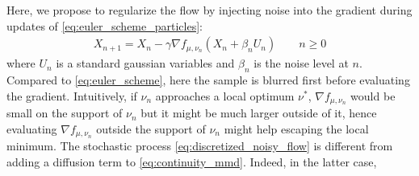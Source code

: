 Here, we propose to regularize the flow by injecting noise into the gradient during updates of \cref{eq:euler_scheme_particles}: %
\begin{align}\label{eq:discretized_noisy_flow}
	X_{n+1} = X_{n} -\gamma \nabla f_{\mu,\nu_n}(X_n+ \beta_n U_n) \qquad n\geq 0
\end{align}
where $U_n$ is a standard gaussian variables and $\beta_n$ is the noise level at $n$. Compared to \cref{eq:euler_scheme}, here the sample is blurred first before evaluating the gradient.
Intuitively, if $\nu_n$ approaches a local optimum $\nu^{*}$, $ \nabla f_{\mu,\nu_n}$ would be small on the support of $\nu_n$ but it might be much larger outside of it, hence evaluating $\nabla f_{\mu,\nu_n}$ outside the support of $\nu_n$ might help escaping the local minimum. The stochastic process \cref{eq:discretized_noisy_flow} is different from adding a diffusion term to \cref{eq:continuity_mmd}. Indeed, in the latter case, %
